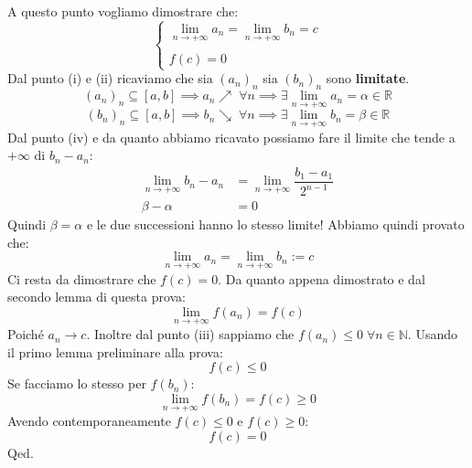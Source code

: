 {  A questo punto vogliamo dimostrare che:
  \begin{equation*}
    \begin{cases*}
      \lim \limits_{n \to +\infty} a_n = \lim \limits_{n \to +\infty} b_n = c\\
      \\
      f(c) = 0
    \end{cases*}
  \end{equation*}
    Dal punto (i) e (ii) ricaviamo che sia $(a_n)_n$ sia $(b_n)_n$ sono \textbf{limitate}.
    \begin{equation*}
      (a_n)_n \subseteq [a, b] \implies a_n \nearrow \; \forall n \implies \exists \lim_{n \to +\infty} a_n = \alpha \in \mathbb{R}
    \end{equation*}
    \begin{equation*}
      (b_n)_n \subseteq [a, b] \implies b_n \searrow \; \forall n \implies \exists \lim_{n \to +\infty} b_n = \beta \in \mathbb{R}
    \end{equation*}
    Dal punto (iv) e da quanto abbiamo ricavato possiamo fare il limite che tende a $+\infty$ di $b_n - a_n$:
    \begin{align*}
      \lim_{n \to +\infty} b_n - a_n &= \lim_{n \to +\infty} \dfrac{b_1 - a_1}{2^{n-1}}\\
      \beta - \alpha &= 0
    \end{align*}
    Quindi $\beta = \alpha$ e le due successioni hanno lo stesso limite! Abbiamo quindi provato che:
    \begin{equation*}
      \lim \limits_{n \to +\infty} a_n = \lim \limits_{n \to +\infty} b_n := c
    \end{equation*}
    Ci resta da dimostrare che $f(c) = 0$. Da quanto appena dimostrato e dal secondo lemma di questa prova:
    \begin{equation*}
      \lim \limits_{n \to +\infty} f(a_n) = f(c)
    \end{equation*}
    Poiché $a_n \to c$. Inoltre dal punto (iii) sappiamo che $f(a_n) \leq 0 \; \forall n \in \mathbb{N}$. Usando il primo lemma preliminare alla prova:
    \begin{equation*}
      f(c) \leq 0
    \end{equation*}
    Se facciamo lo stesso per $f(b_n)$:
    \begin{equation*}
      \lim \limits_{n \to +\infty} f(b_n) = f(c) \geq 0
    \end{equation*}
    Avendo contemporaneamente $f(c) \leq 0$ e $f(c) \geq 0$:
    \begin{equation*}
      f(c) = 0
    \end{equation*}
    \hfill Qed.
}

